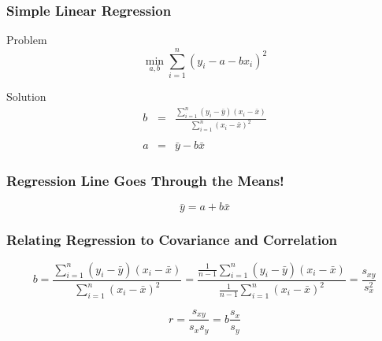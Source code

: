 \documentclass[handout]{beamer}
\begin{document}
\begin{frame}
\frametitle{Simple Linear Regression}
	\begin{block}{Problem}
	$$\min_{a,b}  \sum_{i=1}^n (y_i - a - b x_i)^2$$
\end{block}
\begin{block}{Solution}
	\begin{eqnarray*}
		b &=& \frac{\sum_{i=1}^n \left(y_i - \bar{y}\right)\left(x_i - \bar{x} \right)}{\sum_{i=1}^n \left(x_i - \bar{x}\right)^2}\\ \\
		a &=& \bar{y} - b\bar{x}
	\end{eqnarray*}
\end{block}
\end{frame}


\begin{frame}

\frametitle{Regression Line Goes Through the Means!}
 \Huge
\begin{equation*}\boxed{\bar{y} = a + b\bar{x}}\end{equation*}
\normalsize
\end{frame}

\begin{frame}
	\frametitle{Relating Regression to Covariance and Correlation}
		$$b = \frac{\sum_{i=1}^n \left(y_i - \bar{y}\right)\left(x_i - \bar{x} \right)}{\sum_{i=1}^n \left(x_i - \bar{x}\right)^2} = \frac{\frac{1}{n-1}\sum_{i=1}^n \left(y_i - \bar{y}\right)\left(x_i - \bar{x} \right)}{\frac{1}{n-1}\sum_{i=1}^n \left(x_i - \bar{x}\right)^2} = \frac{s_{xy}}{s_x^2}$$
		
		$$r = \frac{s_{xy}}{s_x s_y} = b \frac{s_x}{s_y}$$
		
\end{frame}

\end{document}
